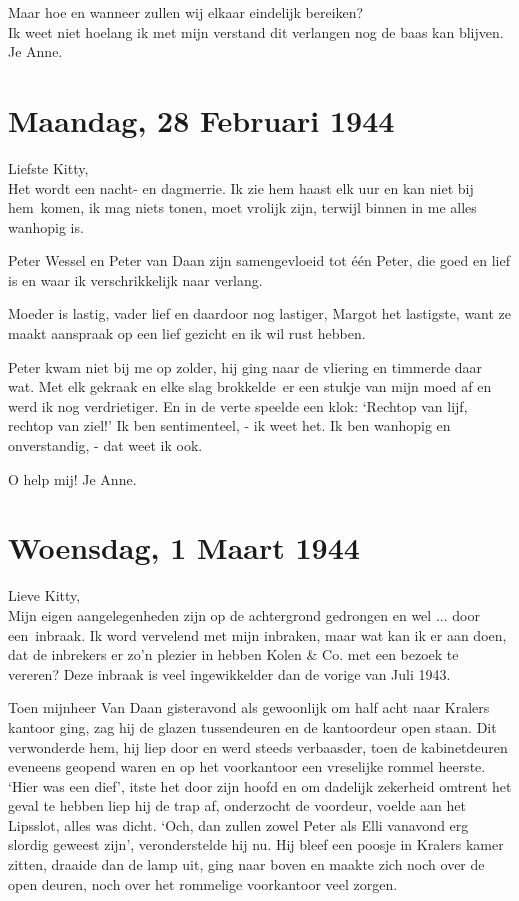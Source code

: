 \documentclass{book}
\begin{document}
Maar hoe en wanneer zullen wij elkaar eindelijk bereiken?\\Ik weet niet
hoelang ik met mijn verstand dit verlangen nog de baas kan blijven. Je
Anne.

\chapter{Maandag, 28 Februari 1944}

Liefste Kitty,\\Het wordt een nacht- en dagmerrie. Ik zie hem haast elk
uur en kan niet bij hem~komen, ik mag niets tonen, moet vrolijk zijn,
terwijl binnen in me alles wanhopig is.

Peter Wessel en Peter van Daan zijn samengevloeid tot één Peter, die
goed en lief is en waar ik verschrikkelijk naar verlang.

Moeder is lastig, vader lief en daardoor nog lastiger, Margot het
lastigste, want ze maakt aanspraak op een lief gezicht en ik wil rust
hebben.

Peter kwam niet bij me op zolder, hij ging naar de vliering en timmerde
daar wat. Met elk gekraak en elke slag brokkelde~er een stukje van mijn
moed af en werd ik nog verdrietiger. En in de verte speelde een klok:
`Rechtop van lijf, rechtop van ziel!' Ik ben sentimenteel, - ik weet
het. Ik ben wanhopig en onverstandig, - dat weet ik ook.

O help mij! Je Anne.

\chapter{Woensdag, 1 Maart 1944}

Lieve Kitty,\\Mijn eigen aangelegenheden zijn op de achtergrond
gedrongen en wel ... door een~inbraak. Ik word vervelend met mijn
inbraken, maar wat kan ik er aan doen, dat de inbrekers er zo'n plezier
in hebben Kolen \& Co. met een bezoek te vereren? Deze inbraak is veel
ingewikkelder dan de vorige van Juli 1943.

Toen mijnheer Van Daan gisteravond als gewoonlijk om half acht naar
Kralers kantoor ging, zag hij de glazen tussendeuren en de kantoordeur
open staan. Dit verwonderde hem, hij liep door en werd steeds
verbaasder, toen de kabinetdeuren eveneens geopend waren en op het
voorkantoor een vreselijke rommel heerste. `Hier was een dief', itste
het door zijn hoofd en om dadelijk zekerheid omtrent het geval te hebben
liep hij de trap af, onderzocht de voordeur, voelde aan het Lipsslot,
alles was dicht. `Och, dan zullen zowel Peter als Elli vanavond erg
slordig geweest zijn', veronderstelde hij nu. Hij bleef een poosje in
Kralers kamer zitten, draaide dan de lamp uit, ging naar boven en maakte
zich noch over de open deuren, noch over het rommelige voorkantoor veel
zorgen.
\end{document}
